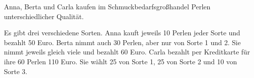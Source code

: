 \documentclass[answers]{exam}
\newcommand{\abs}[1]{\left| #1 \right|}
\newcommand{\R}{\mathbb{R}}
\DeclareMathOperator{\rank}{rank}
\DeclareMathOperator{\Sol}{Sol}
\begin{document}
\begin{questions}

    \newpage
    \question
    Anna, Berta und Carla kaufen im Schmuckbedarfsgroßhandel Perlen unterschiedlicher Qualität.

    Es gibt drei verschiedene Sorten.
    Anna kauft jeweils 10 Perlen jeder Sorte und bezahlt 50 Euro.
    Berta nimmt auch 30 Perlen, aber nur von Sorte 1 und 2.
    Sie nimmt jeweils gleich viele und bezahlt 60 Euro.
    Carla bezahlt per Kreditkarte für ihre 60 Perlen 110 Euro.
    Sie wählt 25 von Sorte 1, 25 von Sorte 2 und 10 von Sorte 3.


\end{questions}
\end{document}
